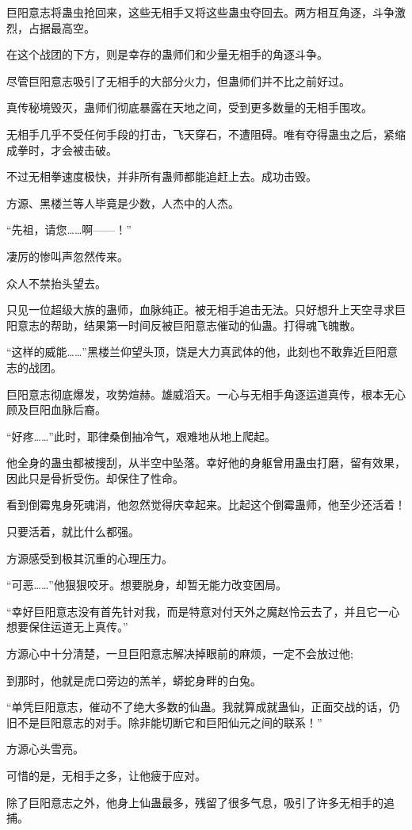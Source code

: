 \begin{this_body}
巨阳意志将蛊虫抢回来，这些无相手又将这些蛊虫夺回去。两方相互角逐，斗争激烈，占据最高空。

在这个战团的下方，则是幸存的蛊师们和少量无相手的角逐斗争。

尽管巨阳意志吸引了无相手的大部分火力，但蛊师们并不比之前好过。

真传秘境毁灭，蛊师们彻底暴露在天地之间，受到更多数量的无相手围攻。

无相手几乎不受任何手段的打击，飞天穿石，不遭阻碍。唯有夺得蛊虫之后，紧缩成拳时，才会被击破。

不过无相拳速度极快，并非所有蛊师都能追赶上去。成功击毁。

方源、黑楼兰等人毕竟是少数，人杰中的人杰。

“先祖，请您……啊——！”

凄厉的惨叫声忽然传来。

众人不禁抬头望去。

只见一位超级大族的蛊师，血脉纯正。被无相手追击无法。只好想升上天空寻求巨阳意志的帮助，结果第一时间反被巨阳意志催动的仙蛊。打得魂飞魄散。

“这样的威能……”黑楼兰仰望头顶，饶是大力真武体的他，此刻也不敢靠近巨阳意志的战团。

巨阳意志彻底爆发，攻势煊赫。雄威滔天。一心与无相手角逐运道真传，根本无心顾及巨阳血脉后裔。

“好疼……”此时，耶律桑倒抽冷气，艰难地从地上爬起。

他全身的蛊虫都被搜刮，从半空中坠落。幸好他的身躯曾用蛊虫打磨，留有效果，因此只是骨折受伤。却保住了性命。

看到倒霉鬼身死魂消，他忽然觉得庆幸起来。比起这个倒霉蛊师，他至少还活着！

只要活着，就比什么都强。

方源感受到极其沉重的心理压力。

“可恶……”他狠狠咬牙。想要脱身，却暂无能力改变困局。

“幸好巨阳意志没有首先针对我，而是特意对付天外之魔赵怜云去了，并且它一心想要保住运道无上真传。”

方源心中十分清楚，一旦巨阳意志解决掉眼前的麻烦，一定不会放过他;

到那时，他就是虎口旁边的羔羊，蟒蛇身畔的白兔。

“单凭巨阳意志，催动不了绝大多数的仙蛊。我就算成就蛊仙，正面交战的话，仍旧不是巨阳意志的对手。除非能切断它和巨阳仙元之间的联系！”

方源心头雪亮。

可惜的是，无相手之多，让他疲于应对。

除了巨阳意志之外，他身上仙蛊最多，残留了很多气息，吸引了许多无相手的追捕。


\end{this_body}
